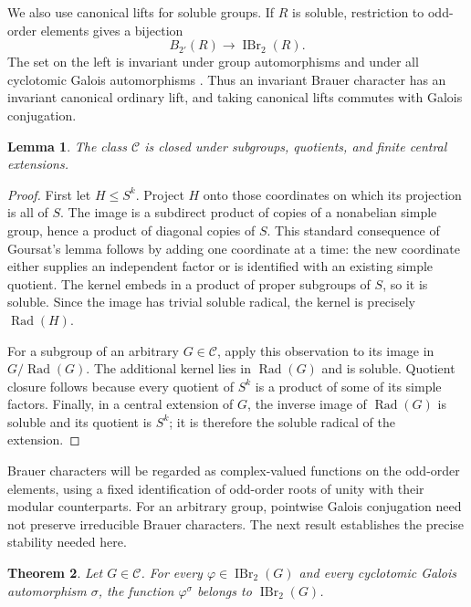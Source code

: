 \documentclass[11pt,a4paper]{amsart}
\newtheorem{theorem}{Theorem}[section]
\newtheorem{lemma}[theorem]{Lemma}
\theoremstyle{remark}
\numberwithin{equation}{section}
\begin{document}
We also use canonical lifts for soluble groups. If $R$ is soluble, restriction
to odd-order elements gives a bijection
\[
B_{2'}(R)\longrightarrow\operatorname{IBr}_2(R).
\]
The set on the left is invariant under group automorphisms and under all
cyclotomic Galois automorphisms \cite[Theorems~1.25 and~4.30]{Vallejo}.
Thus an invariant Brauer character has an invariant canonical ordinary lift,
and taking canonical lifts commutes with Galois conjugation.

\begin{lemma}\label{lemma:class-closure}
The class $\mathcal C$ is closed under subgroups, quotients, and finite
central extensions.
\end{lemma}

\begin{proof}
First let $H\leq S^k$. Project $H$ onto those coordinates on which its
projection is all of $S$. The image is a subdirect product of copies of a
nonabelian simple group, hence a product of diagonal copies of $S$.
This standard consequence of Goursat's lemma follows by adding one
coordinate at a time: the new coordinate either supplies an independent
factor or is identified with an existing simple quotient.
The kernel embeds in a product of proper subgroups of $S$, so it is soluble.
Since the image has trivial soluble radical, the kernel is precisely
$\operatorname{Rad}(H)$.

For a subgroup of an arbitrary $G\in\mathcal C$, apply this observation to
its image in $G/\operatorname{Rad}(G)$. The additional kernel lies in
$\operatorname{Rad}(G)$ and is soluble. Quotient closure follows because
every quotient of $S^k$ is a product of some of its simple factors.
Finally, in a central extension of $G$, the inverse image of
$\operatorname{Rad}(G)$ is soluble and its quotient is $S^k$; it is therefore
the soluble radical of the extension.
\end{proof}

Brauer characters will be regarded as complex-valued functions on the
odd-order elements, using a fixed identification of odd-order roots of
unity with their modular counterparts. For an arbitrary group, pointwise
Galois conjugation need not preserve irreducible Brauer characters. The next
result establishes the precise stability needed here.

\begin{theorem}\label{thm:galois-stability}
Let $G\in\mathcal C$. For every $\varphi\in\operatorname{IBr}_2(G)$ and
every cyclotomic Galois automorphism $\sigma$, the function
$\varphi^\sigma$ belongs to $\operatorname{IBr}_2(G)$.
\end{theorem}
\end{document}
